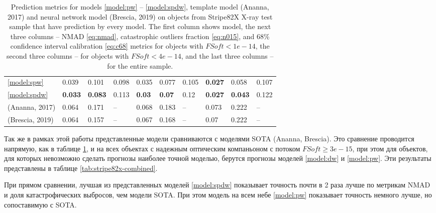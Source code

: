 \documentclass[fleqn,usenatbib]{mnras}
\begin{document}
\begin{table}
\begin{tabular}{llllllllll}
            \ref{model:spw}  &                             0.039 &           0.101 &            0.098 &                             0.035 &          0.077 &            0.105 &                   \textbf{0.027} &           0.058 &           0.107 \\
            \ref{model:spdw} &                    \textbf{0.033} &  \textbf{0.083} &            0.113 &                     \textbf{0.03} &  \textbf{0.07} &             0.12 &                   \textbf{0.027} &  \textbf{0.043} &           0.122 \\
            (Ananna, 2017)   &                             0.064 &           0.171 &           -- &                             0.068 &          0.183 &           -- &                            0.073 &           0.222 &          -- \\
            (Brescia, 2019)         &                             0.064 &           0.157 &           -- &                             0.067 &          0.168 &           -- &                             0.07 &           0.222 &          -- \\
            \hline
            \end{tabular}
            \caption{Prediction metrics for models \ref{model:pw} -- \ref{model:spdw}, template model (Ananna, 2017) and neural network model (Brescia, 2019) on objects from Stripe82X X-ray test sample that have prediction by every model. The first column shows model, the next three columns -- NMAD \eqref{eq:nmad}, catastrophic outliers fraction \eqref{eq:n015}, and 68\% confidence interval calibration \eqref{eq:c68} metrics for objects with $FSoft < 1e-14$, the second three columns -- for objects with $FSoft < 4e-14$, and the last three columns -- for the entire sample.}
            \label{tab:stripe82x-intersection}
\end{table}

Так же в рамках этой работы представленные модели сравниваются с моделями SOTA (Ananna, Brescia). Это сравнение проводится напрямую, как в таблице \ref{tab:stripe82x-intersection}, и на всех объектах с надежным оптическим компаньоном с потоком $FSoft \geq 3e-15$, при этом для объектов, для которых невозможно сделать прогнозы наиболее точной моделью, берутся прогнозы моделей \ref{model:dw} и \ref{model:pw}. Эти результаты представлены в таблице \ref{tab:stripe82x-combined}.

При прямом сравнении, лучшая из представленных моделей \ref{model:spdw} показывает точность почти в 2 раза лучше по метрикам NMAD и доля катастрофических выбросов, чем модели SOTA. При этом модель на всем небе \ref{model:pw} показывает точность немного лучше, но сопоставимую с SOTA.
\end{document}
